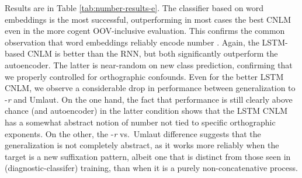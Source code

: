 Results are in Table \ref{tab:number-results-e}. The classifier based
on word embeddings is the most successful, outperforming in most cases
the best CNLM even in the more cogent OOV-inclusive evaluation. This
confirms the common observation that word embeddings reliably encode
number \cite{Mikolov:etal:2013a}. Again, the LSTM-based CNLM is better
than the RNN, but both significantly outperform the autoencoder. The
latter is near-random on new class prediction, confirming that we
properly controlled for orthographic confounds. Even for the better
LSTM CNLM, we observe a considerable drop in performance between
generalization to -\emph{r} and Umlaut. On the one hand, the fact that
performance is still clearly above chance (and autoencoder) in the
latter condition shows that the LSTM CNLM has a somewhat abstract
notion of number not tied to specific orthographic exponents. On the
other, the -\emph{r} vs.~Umlaut difference suggests that the
generalization is not completely abstract, as it works more reliably
when the target is a new suffixation pattern, albeit one that is
distinct from those seen in (diagnostic-classifer) training, than when
it is a purely non-concatenative process.



